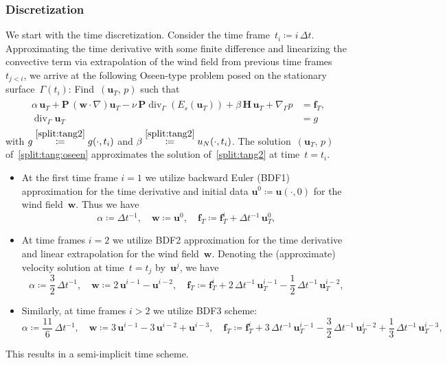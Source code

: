 \documentclass[12pt]{article}
\newcommand{\vect}[1]{\boldsymbol{\mathbf{#1}}}
\DeclareMathOperator{\Div}{div}
\begin{document}
\subsubsection{Discretization}

We start with the time discretization. Consider the time frame~$t_i \coloneqq i\,\Delta t$. Approximating the time derivative with some finite difference and linearizing the convective term via extrapolation of the wind field from previous time frames $t_{j<i}$, we arrive at the following Oseen-type problem posed on the stationary surface~$\Gamma(t_i)$: Find~$(\vect u_T,\,p)$ such that
\begin{align}\begin{split}\label{split:tang:oseen}
	\alpha\,\vect u_T + \vect P\,(\vect w\cdot\nabla)\vect u_T - \nu\,\vect P\Div_\Gamma(E_s(\vect u_T)) + \beta\,\vect H\,\vect u_T + \nabla_\Gamma p &= \vect f_T,\\
	\Div_\Gamma \vect u_T &= g
\end{split}\end{align}
with $g \stackrel{\eqref{split:tang2}}{\coloneqq} g(\cdot, t_i)$ and $\beta \stackrel{\eqref{split:tang2}}{\coloneqq} u_N(\cdot, t_i)$. The solution~$(\vect u_T,\,p)$ of~\eqref{split:tang:oseen} approximates the solution of~\eqref{split:tang2} at time~$t = t_i$.
\begin{itemize}
	\item At the first time frame $i = 1$ we utilize backward Euler (BDF1) approximation for the time derivative and initial data $\vect u^0 \coloneqq \vect u(\cdot, 0)$ for the wind field~$\vect w$. Thus we have
	\begin{equation*}
		\alpha \coloneqq \Delta t^{-1},\quad
		\vect w \coloneqq \vect u^0,\quad
		\vect f_T \coloneqq \vect f_T^i + \Delta t^{-1}\,\vect u_T^0,
	\end{equation*}
	\item At time frames $i = 2$ we utilize BDF2 approximation for the time derivative and linear extrapolation for the wind field~$\vect w$. Denoting the (approximate) velocity solution at time~$t = t_j$ by~$\vect u^j$, we have
	\begin{equation*}
		\alpha \coloneqq \frac 32\,\Delta t^{-1},\quad
		\vect w \coloneqq 2\,\vect u^{i-1} - \vect u^{i-2},\quad
		\vect f_T \coloneqq \vect f_T^i + 2\,\Delta t^{-1}\,\vect u_T^{i-1} - \frac 12\,\Delta t^{-1}\,\vect u_T^{i-2},
	\end{equation*}
	\item Similarly, at time frames $i > 2$ we utilize BDF3 scheme:
	\begin{equation*}
		\alpha \coloneqq \frac{11}{6}\,\Delta t^{-1},\quad
		\vect w \coloneqq 3\,\vect u^{i-1} - 3\,\vect u^{i-2} + \vect u^{i-3},\quad
		\vect f_T \coloneqq \vect f_T^i + 3\,\Delta t^{-1}\,\vect u_T^{i-1} - \frac 32\,\Delta t^{-1}\,\vect u_T^{i-2} + \frac 13\,\Delta t^{-1}\,\vect u_T^{i-3},
	\end{equation*}
\end{itemize}
This results in a semi-implicit time scheme.
\end{document}
